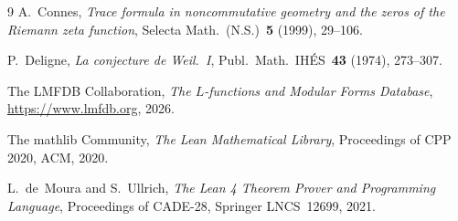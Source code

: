 \documentclass[11pt]{article}
\begin{document}
\begin{thebibliography}{9}
 A.~Connes,
\emph{Trace formula in noncommutative geometry and the zeros of the Riemann zeta function},
Selecta Math.\ (N.S.)~\textbf{5} (1999), 29--106.

 P.~Deligne,
\emph{La conjecture de Weil.~I}, Publ.\ Math.\ IH\'ES~\textbf{43} (1974), 273--307.

 The LMFDB Collaboration,
\emph{The $L$-functions and Modular Forms Database}, \url{https://www.lmfdb.org}, 2026.

 The mathlib Community,
\emph{The Lean Mathematical Library},
Proceedings of CPP 2020, ACM, 2020.

 L.~de~Moura and S.~Ullrich,
\emph{The Lean 4 Theorem Prover and Programming Language},
Proceedings of CADE-28, Springer LNCS~12699, 2021.

\end{thebibliography}
\end{document}
